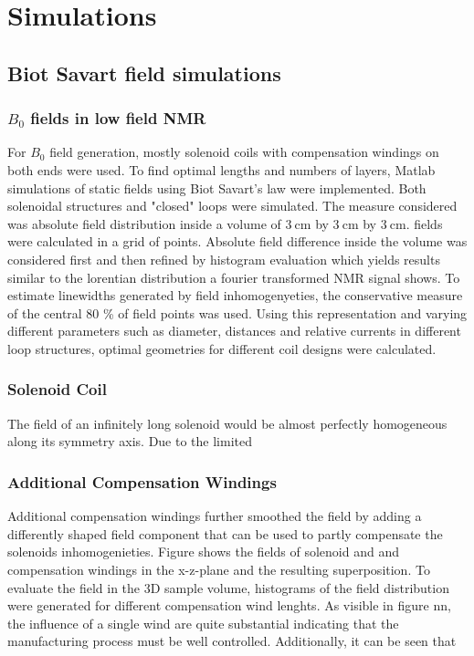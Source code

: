 \chapter{Simulations}\label{chapter:simulations}
\section{Biot Savart field simulations}
\subsection{$B_0$ fields in low field NMR}\label{simulations:B0}
        For $B_0$ field generation, mostly solenoid coils with compensation windings on both ends
        were used. To find optimal lengths and numbers of layers, Matlab simulations of static fields using Biot Savart's law were implemented.
        Both solenoidal structures and "closed" loops were simulated.
        The measure considered was absolute field distribution inside a volume of
        $\SI{3}{\centi\meter}$ by  $\SI{3}{\centi\meter}$ by $\SI{3}{\centi\meter}$. 
        fields were calculated in a grid of  points. Absolute field difference inside the volume was considered first and then refined by
        histogram evaluation which yields results similar to the lorentian distribution a fourier transformed NMR signal shows. To estimate linewidths generated by field inhomogenyeties, the conservative measure of the central 80 \% of field points was used.
        Using this representation and varying different parameters such as diameter, distances and relative currents in different loop structures, optimal geometries for different coil designs were calculated.
        \subsection{Solenoid Coil}
            The field of an infinitely long solenoid would be almost perfectly homogeneous along its symmetry axis. Due to the limited
        \subsection{Additional Compensation Windings}
            Additional compensation windings further smoothed the field by adding a differently shaped field component that can be used to partly compensate the solenoids inhomogenieties. Figure  shows the fields of solenoid and and compensation windings in the x-z-plane and the resulting superposition.
            To evaluate the field in the 3D sample volume, histograms of the field distribution were generated for different compensation wind lenghts. As visible in figure nn, the influence of a single wind are quite substantial indicating that the manufacturing process must be well controlled. Additionally, it can be seen that

